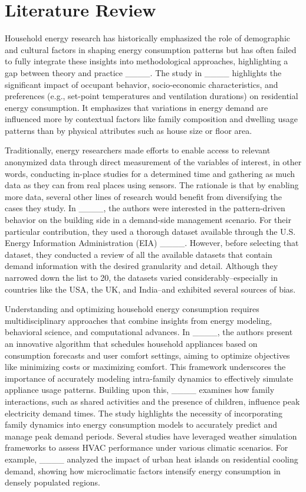 \section{Literature Review}
\label{Sec-Literature}

Household energy research has historically emphasized the role of demographic and cultural factors in shaping energy consumption patterns but has often failed to fully integrate these insights into methodological approaches, highlighting a gap between theory and practice ____. The study in ____ highlights the significant impact of occupant behavior, socio-economic characteristics, and preferences (e.g., set-point temperatures and ventilation durations) on residential energy consumption. It emphasizes that variations in energy demand are influenced more by contextual factors like family composition and dwelling usage patterns than by physical attributes such as house size or floor area.

Traditionally, energy researchers made efforts to enable access to relevant anonymized data through direct measurement of the variables of interest, in other words, conducting in-place studies for a determined time and gathering as much data as they can from real places using sensors. The rationale is that by enabling more data, several other lines of research would benefit from diversifying the cases they study. In ____, the authors were interested in the pattern-driven behavior on the building side in a demand-side management scenario. For their particular contribution, they used a thorough dataset available through the U.S. Energy Information Administration (EIA) ____. However, before selecting that dataset, they conducted a review of all the available datasets that contain demand information with the desired granularity and detail. Although they narrowed down the list to 20, the datasets varied considerably--especially in countries like the USA, the UK, and India--and exhibited several sources of bias.

Understanding and optimizing household energy consumption requires multidisciplinary approaches that combine insights from energy modeling, behavioral science, and computational advances. In ____, the authors present an innovative algorithm that schedules household appliances based on consumption forecasts and user comfort settings, aiming to optimize objectives like minimizing costs or maximizing comfort. This framework underscores the importance of accurately modeling intra-family dynamics to effectively simulate appliance usage patterns. Building upon this, ____ examines how family interactions, such as shared activities and the presence of children, influence peak electricity demand times. The study highlights the necessity of incorporating family dynamics into energy consumption models to accurately predict and manage peak demand periods. Several studies have leveraged weather simulation frameworks to assess HVAC performance under various climatic scenarios. For example, ____ analyzed the impact of urban heat islands on residential cooling demand, showing how microclimatic factors intensify energy consumption in densely populated regions. 

